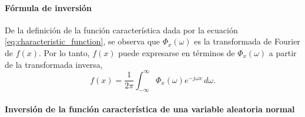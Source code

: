 \documentclass[a4paper]{report}
\begin{document}
\paragraph{Fórmula de inversión}

De la definición de la función característica dada por la ecuación \ref{eq:characteristic_function}, se observa que \(\Phi_x(\omega)\) es la transformada de Fourier de \(f(x)\). Por lo tanto, \(f(x)\) puede expresarse en términos de \(\Phi_x(\omega)\) a partir de la transformada inversa,
\begin{equation}\label{eq:characteristic_function_inversion}
 f(x)=\frac{1}{2\pi}\int_{-\infty}^{\infty}\Phi_x(\omega)e^{-j\omega x}\,d\omega.
\end{equation}

\paragraph{Inversión de la función característica de una variable aleatoria normal}
\end{document}
